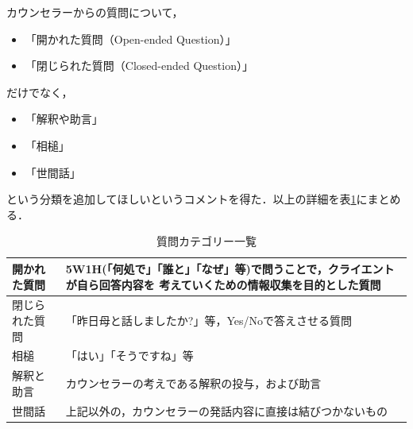 \documentclass[shuuron]{kuee}
\begin{document}
カウンセラーからの質問について，
\begin{itemize}
  \item 「開かれた質問（Open-ended Question）」
  \item 「閉じられた質問（Closed-ended Question）」

\end{itemize}
だけでなく，
\begin{itemize}
  \item 「解釈や助言」
  \item 「相槌」
  \item 「世間話」
\end{itemize}

という分類を追加してほしいというコメントを得た．以上の詳細を表\ref{table:queCate}にまとめる．
\begin{table}
  \caption{質問カテゴリー一覧}
  \label{table:queCate}
  \begin{center}
    \begin{tabular}{|l|p{7cm}|} \hline
      開かれた質問 & 5W1H(「何処で」「誰と」「なぜ」等)で問うことで，クライエントが自ら回答内容を
      考えていくための情報収集を目的とした質問
      \\ \hline
      閉じられた質問  & 「昨日母と話しましたか?」等，Yes/Noで答えさせる質問
      \\ \hline
      相槌 & 「はい」「そうですね」等
      \\ \hline
      解釈と助言  &  カウンセラーの考えである解釈の投与，および助言\\ \hline
      世間話 & 上記以外の，カウンセラーの発話内容に直接は結びつかないもの \\ \hline
    \end{tabular}
  \end{center}
\end{table}

\end{document}
